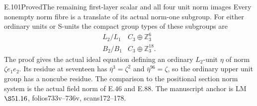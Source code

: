 \begin{statement}{E.101}{Proved}{The remaining first-layer scalar and all four unit norm images}
Every nonempty norm fibre is a translate of its
actual norm-one subgroup. For either ordinary units
or S-units the compact group types of these subgroups are
\[
 \begin{array}{c|c}
 L_2/L_1& C_3\oplus\mathbb Z_3^6\\
 B_2/B_1& C_3\oplus\mathbb Z_3^{18}.
 \end{array}
 \tag{E101.10}
\]
The proof gives the actual ideal equation defining
an ordinary \(L_2\)-unit \(\eta\) of norm
\(\zeta e_1e_2\). Its residue at seventeen has
\(\bar\eta^3=\zeta^2\) and \(\bar\eta^{96}=\zeta\),
so the ordinary upper unit group has a noncube residue.
The comparison to the positional section norm system
is the actual field norm of E.46 and E.88.
The manuscript anchor is LM \(\S51.16\),
folios733v--736v, scans172--178.
\end{statement}

